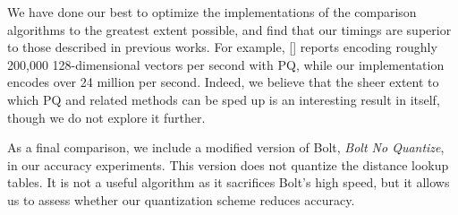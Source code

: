 We have done our best to optimize the implementations of the comparison algorithms to the greatest extent possible, and find that our timings are superior to those described in previous works. For example, [] reports encoding roughly 200,000 128-dimensional vectors per second with PQ, while our implementation encodes over 24 million per second. Indeed, we believe that the sheer extent to which PQ and related methods can be sped up is an interesting result in itself, though we do not explore it further.

As a final comparison, we include a modified version of Bolt, \textit{Bolt No Quantize}, in our accuracy experiments. This version does not quantize the distance lookup tables. It is not a useful algorithm as it sacrifices Bolt's high speed, but it allows us to assess whether our quantization scheme reduces accuracy.







